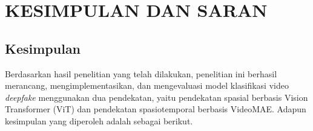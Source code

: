 \newpage
\chapter{KESIMPULAN DAN SARAN} \label{Bab V}

\section{Kesimpulan} \label{V.Kesimpulan}
Berdasarkan hasil penelitian yang telah dilakukan, penelitian ini berhasil merancang, mengimplementasikan, dan mengevaluasi model klasifikasi video \textit{deepfake} menggunakan dua pendekatan, yaitu pendekatan spasial berbasis Vision Transformer (ViT) dan pendekatan spasiotemporal berbasis VideoMAE. Adapun kesimpulan yang diperoleh adalah sebagai berikut. \par

